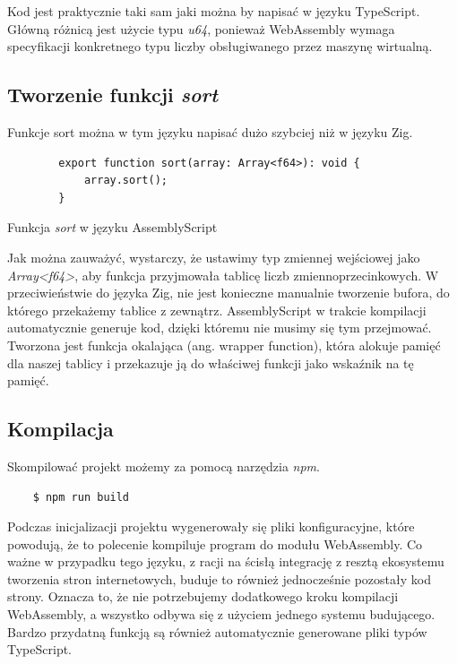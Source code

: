 \documentclass[language=polish,type=master]{aghmodern}
\begin{document}
Kod jest praktycznie taki sam jaki można by napisać w języku TypeScript.
Główną różnicą jest użycie typu \emph{u64}, ponieważ WebAssembly wymaga specyfikacji konkretnego typu liczby obsługiwanego przez maszynę wirtualną.

\subsection{Tworzenie funkcji \emph{sort}}

Funkcje sort można w tym języku napisać dużo szybciej niż w języku Zig.

\begin{listing}[H]
    \begin{verbatim}
        export function sort(array: Array<f64>): void {
            array.sort();
        }
    \end{verbatim}
    \caption{Funkcja \emph{sort} w języku AssemblyScript}
\end{listing}

Jak można zauważyć, wystarczy, że ustawimy typ zmiennej wejściowej jako \emph{Array<f64>}, aby funkcja przyjmowała tablicę liczb zmiennoprzecinkowych.
W przeciwieństwie do języka Zig, nie jest konieczne manualnie tworzenie bufora, do którego przekażemy tablice z zewnątrz.
AssemblyScript w trakcie kompilacji automatycznie generuje kod, dzięki któremu nie musimy się tym przejmować.
Tworzona jest funkcja okalająca (ang. wrapper function), która alokuje pamięć dla naszej tablicy i przekazuje ją do właściwej funkcji jako wskaźnik na tę pamięć.

\subsection{Kompilacja}
Skompilować projekt możemy za pomocą narzędzia \emph{npm}.

\begin{verbatim}
    $ npm run build
\end{verbatim}

Podczas inicjalizacji projektu wygenerowały się pliki konfiguracyjne, które powodują, że to polecenie kompiluje program do modułu WebAssembly.
Co ważne w przypadku tego języku, z racji na ścisłą integrację z resztą ekosystemu tworzenia stron internetowych, buduje to również jednocześnie pozostały kod strony.
Oznacza to, że nie potrzebujemy dodatkowego kroku kompilacji WebAssembly, a wszystko odbywa się z użyciem jednego systemu budującego.
Bardzo przydatną funkcją są również automatycznie generowane pliki typów TypeScript.
\end{document}
